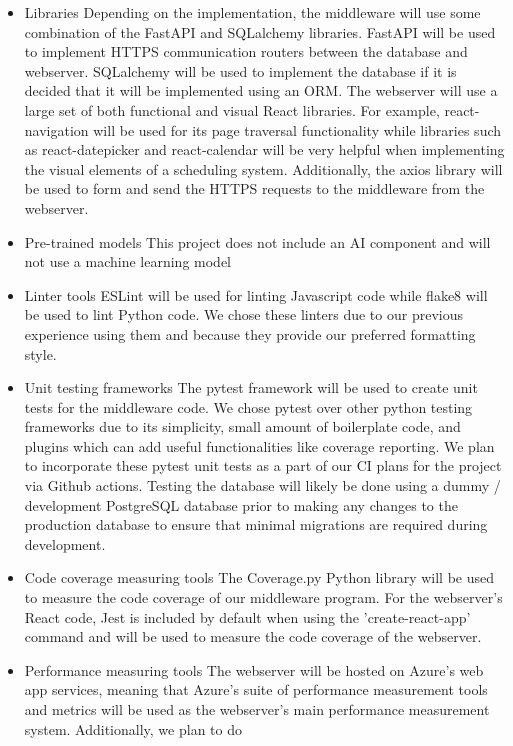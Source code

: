 \documentclass{article}
\begin{document}
\begin{itemize}
\item Libraries
\subitem Depending on the implementation, the middleware will use some combination
of the FastAPI and SQLalchemy libraries. FastAPI will be used to implement HTTPS 
communication routers between the database and webserver. SQLalchemy will be used to 
implement the database if it is decided that it will be implemented using an ORM.
\subitem The webserver will use a large set of both functional and visual React
libraries. For example, react-navigation will be used for its page traversal 
functionality while libraries such as react-datepicker and react-calendar will 
be very helpful when implementing the visual elements of a scheduling system. 
Additionally, the axios library will be used to form and send the HTTPS requests 
to the middleware from the webserver.
\item Pre-trained models
\subitem This project does not include an AI component and will not use 
a machine learning model
\item Linter tools
\subitem ESLint will be used for linting Javascript code while flake8 will be 
used to lint Python code. We chose these linters due to our previous experience 
using them and because they provide our preferred formatting style.
\item Unit testing frameworks
\subitem The pytest framework will be used to create unit tests for the middleware
code. We chose pytest over other python testing frameworks due to its simplicity, 
small amount of boilerplate code, and plugins which can add useful functionalities
like coverage reporting. We plan to incorporate these pytest unit tests as a part
of our CI plans for the project via Github actions.
\subitem Testing the database will likely be done using a dummy / development 
PostgreSQL database prior to making any changes to the production database to 
ensure that minimal migrations are required during development.
\item Code coverage measuring tools
\subitem The Coverage.py Python library will be used to measure the code coverage
of our middleware program. For the webserver's React code, Jest is included by 
default when using the 'create-react-app' command and will be used to measure 
the code coverage of the webserver.
\item Performance measuring tools
\subitem The webserver will be hosted on Azure's web app services, meaning that
Azure's suite of performance measurement tools and metrics will be used as the 
webserver's main performance measurement system. Additionally, we plan to do

\end{itemize}
\end{document}
